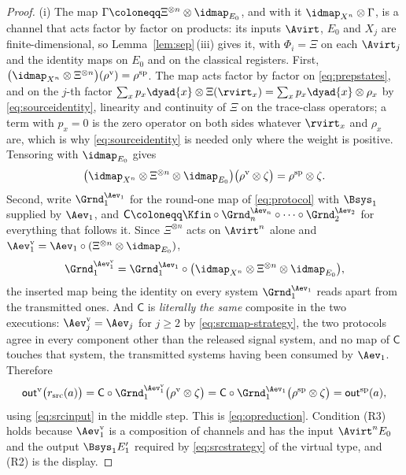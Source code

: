 \begin{proof}
(i) The map $\Gamma\coloneqq\Xi^{\otimes n}\otimes\idmap_{E_0}$, and with it
$\idmap_{X^{n}}\otimes\Gamma$, is a channel that acts factor by factor on
products: its inputs $\Avirt$, $E_0$ and $X_j$ are finite-dimensional, so
Lemma~\ref{lem:sep}\,(iii) gives it, with $\Phi_i=\Xi$ on each $\Avirt_j$
and the identity maps on $E_0$ and on the classical registers. First,
$\big(\idmap_{X^{n}}\otimes\Xi^{\otimes n}\big)
(\rho^{\mathrm{v}})=\rho^{\mathrm{sp}}$. The map acts factor by factor on
\eqref{eq:prepstates}, and on the $j$-th factor
$\sum_xp_x\dyad{x}\otimes\Xi(\rvirt_x)=\sum_xp_x\dyad{x}\otimes\rho_x$ by
\eqref{eq:sourceidentity}, linearity and continuity of $\Xi$ on the trace-class
operators; a term with $p_x=0$ is the zero operator on both sides whatever
$\rvirt_x$ and $\rho_x$ are, which is why \eqref{eq:sourceidentity} is needed
only where the weight is positive. Tensoring with $\idmap_{E_0}$ gives
\begin{equation}\label{eq:srcinput}
  \big(\idmap_{X^{n}}\otimes\Xi^{\otimes n}\otimes\idmap_{E_0}\big)
  \big(\rho^{\mathrm{v}}\otimes\zeta\big)
  =\rho^{\mathrm{sp}}\otimes\zeta .
\end{equation}
Second, write $\Grnd^{\Aev_1}_1$ for the round-one map of \eqref{eq:protocol}
with $\Bsys_1$ supplied by $\Aev_1$, and
$\mathsf{C}\coloneqq\Kfin\circ\Grnd^{\Aev_n}_n\circ\dots\circ\Grnd^{\Aev_2}_2$
for everything that follows it. Since $\Xi^{\otimes n}$ acts on $\Avirt^{n}$
alone and $\Aev^{\mathrm{v}}_1=\Aev_1\circ(\Xi^{\otimes n}\otimes\idmap_{E_0})$,
\begin{equation*}
  \Grnd^{\Aev^{\mathrm{v}}_1}_1
  =\Grnd^{\Aev_1}_1\circ
   \big(\idmap_{X^{n}}\otimes\Xi^{\otimes n}\otimes\idmap_{E_0}\big),
\end{equation*}
the inserted map being the identity on every system $\Grnd^{\Aev_1}_1$ reads
apart from the transmitted ones. And $\mathsf{C}$ is \emph{literally the same}
composite in the two executions: $\Aev^{\mathrm{v}}_j=\Aev_j$ for $j\ge2$ by
\eqref{eq:srcmap-strategy}, the two protocols agree in every component other
than the released signal system, and no map of $\mathsf{C}$ touches that
system, the transmitted systems having been consumed by $\Aev_1$. Therefore
\begin{equation*}
  \mathsf{out}^{\mathrm{v}}\big(r_{\mathrm{src}}(a)\big)
  =\mathsf{C}\circ\Grnd^{\Aev^{\mathrm{v}}_1}_1
     \big(\rho^{\mathrm{v}}\otimes\zeta\big)
  =\mathsf{C}\circ\Grnd^{\Aev_1}_1\big(\rho^{\mathrm{sp}}\otimes\zeta\big)
  =\mathsf{out}^{\mathrm{sp}}(a),
\end{equation*}
using \eqref{eq:srcinput} in the middle step. This is
\eqref{eq:opreduction}. Condition (R3) holds because
$\Aev^{\mathrm{v}}_1$ is a composition of channels and has the input
$\Avirt^{n}E_0$ and the output $\Bsys_1E'_1$ required by
\eqref{eq:srcstrategy} of the virtual type, and (R2) is the display.


\end{proof}
